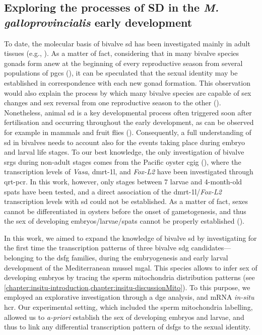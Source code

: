 \subsection{Exploring the processes of SD in the \textit{M. galloprovincialis} early development}
To date, the molecular basis of bivalve \gls{sd} has been investigated mainly in adult tissues (e.g., ). As a matter of fact, considering that in many bivalve species gonads form anew at the beginning of every reproductive season from several populations of \glspl{pgc} (), it can be speculated that the sexual identity may be established in correspondence with each new gonad formation. This observation would also explain the process by which many bivalve species are capable of sex changes and sex reversal from one reproductive season to the other (). Nonetheless, animal \gls{sd} is a key developmental process often triggered soon after fertilisation and occurring throughout the early development, as can be observed for example in mammals and fruit flies (). Consequently, a full understanding of \gls{sd} in bivalves needs to account also for the events taking place during embryo and larval life stages. To our best knowledge, the only investigation of bivalve \glspl{srg} during non-adult stages comes from the Pacific oyster \gls{cgig} (), where the transcription levels of \textit{Vasa}, \gls{dmrt-1l}, and \textit{Fox-L2} have been investigated through \gls{qrt-pcr}. In this work, however, only stages between \qty{7}{\dpf} larvae and 4-month-old spats have been tested, and a direct association of the \gls{dmrt-1l}/\textit{Fox-L2} transcription levels with \gls{sd} could not be established. As a matter of fact, sexes cannot be differentiated in oysters before the onset of gametogenesis, and thus the sex of developing embryos/larvae/spats cannot be properly established ().

In this work, we aimed to expand the knowledge of bivalve \gls{sd} by investigating for the first time the transcription patterns of three bivalve \gls{sdg} candidates---belonging to the \gls{dsfg} families, during the embryogenesis and early larval development of the Mediterranean mussel \gls{mgal}. This species allows to infer sex of developing embryos by tracing the sperm mitochondria distribution patterns (see \cref{chapter:insitu-introduction,chapter:insitu-discussionMito}). To this purpose, we employed an explorative investigation through a \gls{dge} analysis, and mRNA \textit{in-situ} \gls{hcr}. Our experimental setting, which included the sperm mitochondria labelling, allowed us to \textit{a-priori} establish the sex of developing embryos and larvae, and thus to link any differential transcription pattern of \glspl{dsfg} to the sexual identity.


